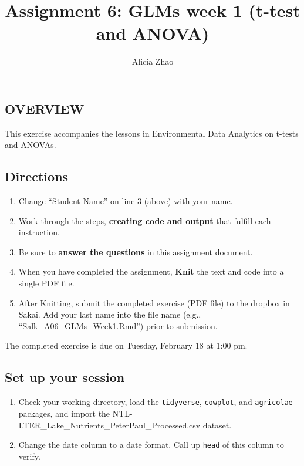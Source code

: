 \documentclass[]{article}
\title{Assignment 6: GLMs week 1 (t-test and ANOVA)}
\author{Alicia Zhao}
\date{}
\providecommand{\tightlist}{%
  \setlength{\itemsep}{0pt}\setlength{\parskip}{0pt}}
\begin{document}
\maketitle

\hypertarget{overview}{%
\subsection{OVERVIEW}\label{overview}}

This exercise accompanies the lessons in Environmental Data Analytics on
t-tests and ANOVAs.

\hypertarget{directions}{%
\subsection{Directions}\label{directions}}

\begin{enumerate}
\def\labelenumi{\arabic{enumi}.}
\tightlist
\item
  Change ``Student Name'' on line 3 (above) with your name.
\item
  Work through the steps, \textbf{creating code and output} that fulfill
  each instruction.
\item
  Be sure to \textbf{answer the questions} in this assignment document.
\item
  When you have completed the assignment, \textbf{Knit} the text and
  code into a single PDF file.
\item
  After Knitting, submit the completed exercise (PDF file) to the
  dropbox in Sakai. Add your last name into the file name (e.g.,
  ``Salk\_A06\_GLMs\_Week1.Rmd'') prior to submission.
\end{enumerate}

The completed exercise is due on Tuesday, February 18 at 1:00 pm.

\hypertarget{set-up-your-session}{%
\subsection{Set up your session}\label{set-up-your-session}}

\begin{enumerate}
\def\labelenumi{\arabic{enumi}.}
\item
  Check your working directory, load the \texttt{tidyverse},
  \texttt{cowplot}, and \texttt{agricolae} packages, and import the
  NTL-LTER\_Lake\_Nutrients\_PeterPaul\_Processed.csv dataset.
\item
  Change the date column to a date format. Call up \texttt{head} of this
  column to verify.
\end{enumerate}
\end{document}
